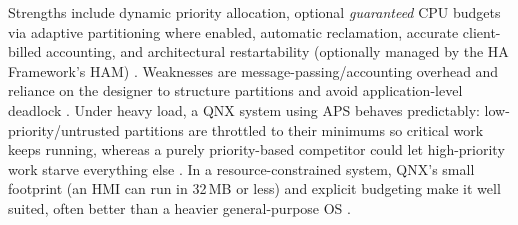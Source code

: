 Strengths include dynamic priority allocation, optional
\emph{guaranteed} CPU budgets via adaptive partitioning where enabled,
automatic reclamation, accurate client-billed accounting, and
architectural restartability (optionally managed by the HA Framework's
HAM) \citep{qnx_memman, qnx_ham, qnx_aps}. Weaknesses are
message-passing/accounting overhead and reliance on the designer to
structure partitions and avoid application-level deadlock
\citep{qnx_aps, qnx_arm_memory}. Under heavy load, a QNX system using
APS behaves predictably: low-priority/untrusted partitions are
throttled to their minimums so critical work keeps running, whereas a
purely priority-based competitor could let high-priority work starve
everything else \citep{qnx_aps}. In a resource-constrained system,
QNX's small footprint (an HMI can run in 32\,MB or less) and explicit
budgeting make it well suited, often better than a heavier
general-purpose OS \citep{slideshare_rim_qnx}.
